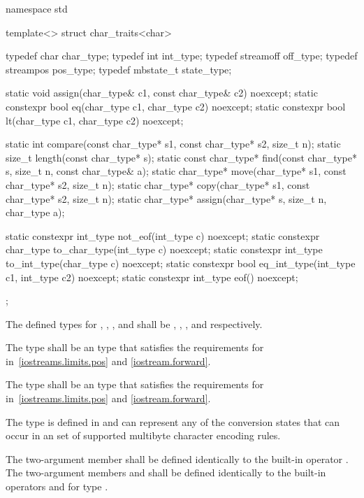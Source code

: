 %
\begin{codeblock}
namespace std {
  template<> struct char_traits<char> {
    typedef char        char_type;
    typedef int         int_type;
    typedef streamoff   off_type;
    typedef streampos   pos_type;
    typedef mbstate_t   state_type;

    static void assign(char_type& c1, const char_type& c2) noexcept;
    static constexpr bool eq(char_type c1, char_type c2) noexcept;
    static constexpr bool lt(char_type c1, char_type c2) noexcept;

    static int compare(const char_type* s1, const char_type* s2, size_t n);
    static size_t length(const char_type* s);
    static const char_type* find(const char_type* s, size_t n,
                 const char_type& a);
    static char_type* move(char_type* s1, const char_type* s2, size_t n);
    static char_type* copy(char_type* s1, const char_type* s2, size_t n);
    static char_type* assign(char_type* s, size_t n, char_type a);

    static constexpr int_type not_eof(int_type c) noexcept;
    static constexpr char_type to_char_type(int_type c) noexcept;
    static constexpr int_type to_int_type(char_type c) noexcept;
    static constexpr bool eq_int_type(int_type c1, int_type c2) noexcept;
    static constexpr int_type eof() noexcept;
  };
}
\end{codeblock}

\pnum
The defined types for
,
,
,
and
shall be
,
,
,
and
respectively.

\pnum
The type
shall be an  type that satisfies the requirements for
in~\ref{iostreams.limits.pos} and \ref{iostream.forward}.

\pnum
The type
shall be an  type that satisfies the requirements for
in~\ref{iostreams.limits.pos} and \ref{iostream.forward}.

\pnum
The type
is defined in
and can represent any of the conversion states that can occur in an
 set of supported multibyte
character encoding rules.

\pnum
The two-argument member  shall be defined identically to the
built-in operator \tcode{=}. The two-argument members 
and  shall be defined identically to the built-in operators
\tcode{==} and \tcode{<} for type 
.


